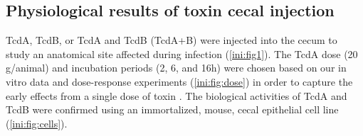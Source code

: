 \begin{table}[h!]
\centering
\begin{adjustwidth}{-1cm}{}
\end{adjustwidth}
\caption[Survival in cecal injection experiments]
    {\textbf{Survival in cecal injection experiments}
The ``15/16*'' in the table are the mice shown in
\autoref{ini:fig:dose}. Only four of these mice were given 20 \textmugreek{}g, and
only these four are included in the ``Totals''. The one mouse that did not
survive in the dose-response experiment was given 5\textmugreek{}g of TcdA.
The TECHLAB\textsuperscript{\textregistered{}} lot numbers 
of the toxins used are given in the last two columns. Mice used for microarrays
and all protein measurements were from experiments 1 and 2. The numbers
give the fraction of survivors in each sample group (\# survivors/total mice).}
\label{ini:tab:sizes}
\end{table}


\subsection{ Physiological results of toxin cecal injection }
TcdA, TcdB, or TcdA and TcdB (TcdA+B) were injected into the cecum 
to study an anatomical site affected during infection (\autoref{ini:fig1}). 
The TcdA dose (20 \textmugreek{}g/animal) and incubation periods (2, 6, and 
16h) were chosen based on our in vitro data and dose-response experiments 
(\autoref{ini:fig:dose}) in order to capture the early effects from a 
single dose of toxin \cite{DAuria:2012bd}. The biological activities 
of TcdA and TcdB were confirmed using an immortalized, mouse, cecal 
epithelial cell line (\autoref{ini:fig:cells}).


